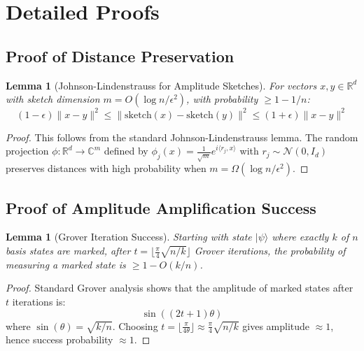 \documentclass[11pt]{article}
\newtheorem{lemma}[theorem]{Lemma}
\begin{document}
\appendix

\section{Detailed Proofs}

\subsection{Proof of Distance Preservation}

\begin{lemma}[Johnson-Lindenstrauss for Amplitude Sketches]
For vectors $x, y \in \mathbb{R}^d$ with sketch dimension $m = O(\log n / \epsilon^2)$, with probability $\geq 1 - 1/n$:
\begin{equation}
(1-\epsilon) \|x-y\|^2 \leq \|\text{sketch}(x) - \text{sketch}(y)\|^2 \leq (1+\epsilon) \|x-y\|^2
\end{equation}
\end{lemma}

\begin{proof}
This follows from the standard Johnson-Lindenstrauss lemma. The random projection $\phi: \mathbb{R}^d \to \mathbb{C}^m$ defined by $\phi_j(x) = \frac{1}{\sqrt{m}} e^{i\langle r_j, x \rangle}$ with $r_j \sim \mathcal{N}(0, I_d)$ preserves distances with high probability when $m = \Omega(\log n / \epsilon^2)$.
\end{proof}

\subsection{Proof of Amplitude Amplification Success}

\begin{lemma}[Grover Iteration Success]
Starting with state $|\psi\rangle$ where exactly $k$ of $n$ basis states are marked, after $t = \lfloor \frac{\pi}{4}\sqrt{n/k} \rfloor$ Grover iterations, the probability of measuring a marked state is $\geq 1 - O(k/n)$.
\end{lemma}

\begin{proof}
Standard Grover analysis shows that the amplitude of marked states after $t$ iterations is:
\begin{equation}
\sin((2t+1) \theta)
\end{equation}
where $\sin(\theta) = \sqrt{k/n}$. Choosing $t = \lfloor \frac{\pi}{4\theta} \rfloor \approx \frac{\pi}{4}\sqrt{n/k}$ gives amplitude $\approx 1$, hence success probability $\approx 1$.
\end{proof}
\end{document}
